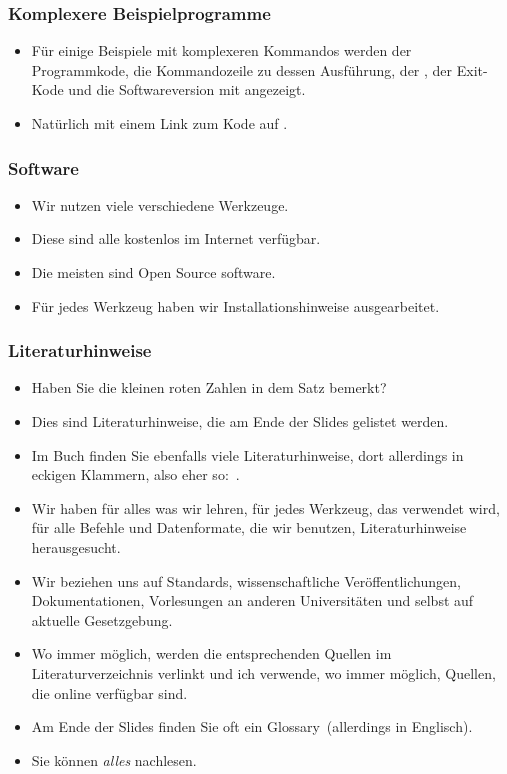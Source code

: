\documentclass[aspectratio=169,mathserif,notheorems]{beamer}%
\begin{document}
%
\begin{frame}%
\frametitle{Komplexere Beispielprogramme}%
\parbox{0.435\linewidth}{%
\begin{itemize}%
\item Für einige Beispiele mit komplexeren Kommandos werden der Programmkode, die Kommandozeile zu dessen Ausführung, der \cite{J2024PTOGBSI8IS12E:SSSSIS}, der Exit-Kode\cite{J2024PTOGBSI8IS12E:TAP} und die Softwareversion mit angezeigt.%
\item<2-> Natürlich mit einem Link zum Kode auf \github.%
\end{itemize}%
}%
%
\end{frame}%
%
\begin{frame}%
\frametitle{Software}%
\begin{itemize}%
\item Wir nutzen viele verschiedene Werkzeuge.%
\item<2-> Diese sind alle kostenlos im Internet verfügbar.%
\item<3-> Die meisten sind Open Source software.%
\item<4-> Für jedes Werkzeug haben wir Installationshinweise ausgearbeitet.%
\end{itemize}%
\end{frame}%
%
\begin{frame}%
\frametitle{Literaturhinweise}%
\begin{itemize}%
\item Haben Sie die kleinen roten Zahlen in dem Satz \emph{} bemerkt?%
\item<2-> Dies sind Literaturhinweise, die am Ende der Slides gelistet werden.%
\item<3-> Im Buch \cite{databases} finden Sie ebenfalls viele Literaturhinweise, dort allerdings in eckigen Klammern, also eher so:~.%
\item<4-> Wir haben für alles was wir lehren, für jedes Werkzeug, das verwendet wird, für alle Befehle und Datenformate, die wir benutzen, Literaturhinweise herausgesucht.%
\item<5-> Wir beziehen uns auf Standards, wissenschaftliche Veröffentlichungen, Dokumentationen, Vorlesungen an anderen Universitäten und selbst auf aktuelle Gesetzgebung.%
\item<6-> Wo immer möglich, werden die entsprechenden Quellen im Literaturverzeichnis verlinkt und ich verwende, wo immer möglich, Quellen, die online verfügbar sind.%
\item<7-> Am Ende der Slides finden Sie oft ein Glossary~(allerdings in Englisch).%
\item<8-> Sie können \emph{alles} nachlesen.%
\end{itemize}%
\end{frame}%
\end{document}

